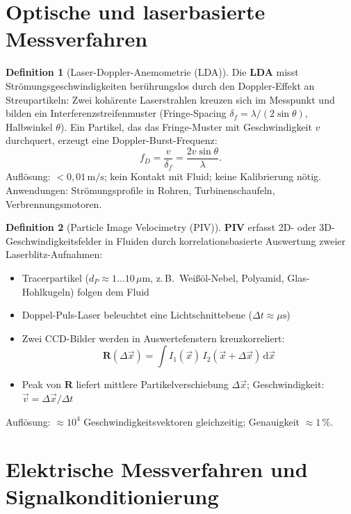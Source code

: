 ﻿\documentclass[a4paper,12pt]{report}
\theoremstyle{definition}
\newtheorem{definition}{Definition}
\begin{document}
\section{Optische und laserbasierte Messverfahren}

\begin{definition}[Laser-Doppler-Anemometrie (LDA)]
Die \textbf{LDA} misst Strömungsgeschwindigkeiten berührungslos durch den
Doppler-Effekt an Streupartikeln:
Zwei kohärente Laserstrahlen kreuzen sich im Messpunkt und bilden
ein Interferenzstreifenmuster (Fringe-Spacing $\delta_f = \lambda/(2\sin\theta)$,
Halbwinkel $\theta$). Ein Partikel, das das Fringe-Muster mit Geschwindigkeit $v$
durchquert, erzeugt eine Doppler-Burst-Frequenz:
\[
  f_D = \frac{v}{\delta_f} = \frac{2v\sin\theta}{\lambda}.
\]
Auflösung: $< 0{,}01\,\mathrm{m/s}$; kein Kontakt mit Fluid; keine Kalibrierung nötig.
Anwendungen: Strömungsprofile in Rohren, Turbinenschaufeln, Verbrennungsmotoren.
\end{definition}

\begin{definition}[Particle Image Velocimetry (PIV)]
\textbf{PIV} erfasst 2D- oder 3D-Geschwindigkeitsfelder in Fluiden
durch korrelationsbasierte Auswertung zweier Laserblitz-Aufnahmen:
\begin{itemize}
    \item[-] Tracerpartikel ($d_P \approx 1\ldots10\,\mu\mathrm{m}$,
          z.\,B.\ Weißöl-Nebel, Polyamid, Glas-Hohlkugeln) folgen dem Fluid
    \item[-] Doppel-Puls-Laser beleuchtet eine Lichtschnittebene ($\Delta t \approx \mu\mathrm{s}$)
    \item[-] Zwei CCD-Bilder werden in Auswertefenstern kreuzkorreliert:
          \[
            \mathbf{R}(\Delta\vec{x}) = \int I_1(\vec{x})\,I_2(\vec{x}+\Delta\vec{x})\,\mathrm{d}\vec{x}
          \]
    \item[-] Peak von $\mathbf{R}$ liefert mittlere Partikelverschiebung
          $\Delta\vec{x}$; Geschwindigkeit: $\vec{v} = \Delta\vec{x}/\Delta t$
\end{itemize}
Auflösung: $\approx 10^4$ Geschwindigkeitsvektoren gleichzeitig; Genauigkeit $\approx 1\,\%$.
\end{definition}

\section{Elektrische Messverfahren und Signalkonditionierung}
\end{document}
